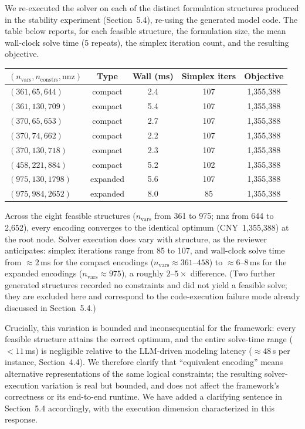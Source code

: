 \documentclass[11pt,a4paper]{article}
\begin{document}
We re-executed the solver on each of the distinct formulation structures produced in the stability experiment (Section~5.4), re-using the generated model code. The table below reports, for each feasible structure, the formulation size, the mean wall-clock solve time (5 repeats), the simplex iteration count, and the resulting objective.

\begin{center}
\small
\begin{tabular}{lcccc}
\toprule
$(n_{\text{vars}}, n_{\text{constrs}}, \text{nnz})$ & Type & Wall (ms) & Simplex iters & Objective \\
\midrule
$(361, 65, 644)$   & compact  & 2.4  & 107 & 1{,}355{,}388 \\
$(361, 130, 709)$  & compact  & 5.4  & 107 & 1{,}355{,}388 \\
$(370, 65, 653)$   & compact  & 2.7  & 107 & 1{,}355{,}388 \\
$(370, 74, 662)$   & compact  & 2.2  & 107 & 1{,}355{,}388 \\
$(370, 130, 718)$  & compact  & 2.3  & 107 & 1{,}355{,}388 \\
$(458, 221, 884)$  & compact  & 5.2  & 102 & 1{,}355{,}388 \\
$(975, 130, 1798)$ & expanded & 5.6  & 107 & 1{,}355{,}388 \\
$(975, 984, 2652)$ & expanded & 8.0  & 85  & 1{,}355{,}388 \\
\bottomrule
\end{tabular}
\end{center}

Across the eight feasible structures ($n_{\text{vars}}$ from 361 to 975; nnz from 644 to 2{,}652), every encoding converges to the identical optimum (CNY~1{,}355{,}388) at the root node. Solver execution does vary with structure, as the reviewer anticipates: simplex iterations range from 85 to 107, and wall-clock solve time from ${\approx}2$\,ms for the compact encodings ($n_{\text{vars}}\!\approx\!361$--$458$) to ${\approx}6$--$8$\,ms for the expanded encodings ($n_{\text{vars}}\!\approx\!975$), a roughly $2$--$5\times$ difference. (Two further generated structures recorded no constraints and did not yield a feasible solve; they are excluded here and correspond to the code-execution failure mode already discussed in Section~5.4.)

Crucially, this variation is bounded and inconsequential for the framework: every feasible structure attains the correct optimum, and the entire solve-time range ($<\!11$\,ms) is negligible relative to the LLM-driven modeling latency (${\approx}48$\,s per instance, Section~4.4). We therefore clarify that ``equivalent encoding'' means alternative representations of the same logical constraints; the resulting solver-execution variation is real but bounded, and does not affect the framework's correctness or its end-to-end runtime. We have added a clarifying sentence in Section~5.4 accordingly, with the execution dimension characterized in this response.
\end{document}
